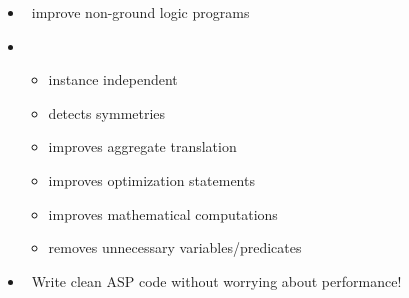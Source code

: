 \begin{frame}{\ngo}
  \begin{itemize}
  \item {} \ improve non-ground logic programs
  \item {} \
    \begin{itemize}
    \item instance independent
    \item detects symmetries
    \item improves aggregate translation
    \item improves optimization statements
    \item improves mathematical computations
    \item removes unnecessary variables/predicates
    \end{itemize}
  \item {} \ Write clean ASP code without worrying about performance!
  \end{itemize}
\end{frame}
%
